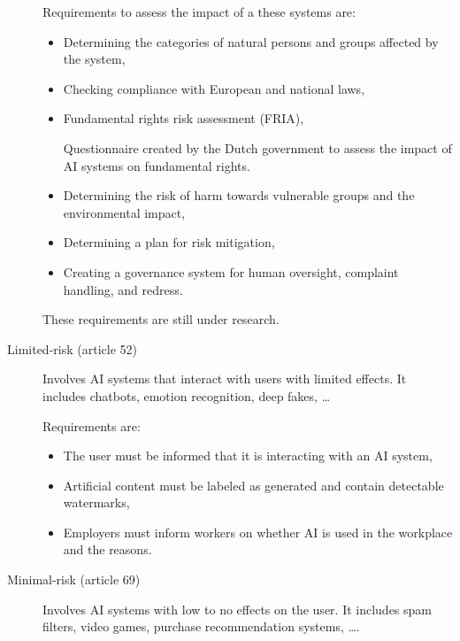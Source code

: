 \begin{description}
        Requirements to assess the impact of a these systems are:
        \begin{itemize}
            \item Determining the categories of natural persons and groups affected by the system,
            \item Checking compliance with European and national laws,
            \item Fundamental rights risk assessment (FRIA),
                \begin{example}[FRAIA]
                    Questionnaire created by the Dutch government to assess the impact of AI systems on fundamental rights.
                \end{example}
            \item Determining the risk of harm towards vulnerable groups and the environmental impact,
            \item Determining a plan for risk mitigation,
            \item Creating a governance system for human oversight, complaint handling, and redress.
        \end{itemize}

        \begin{remark}
            These requirements are still under research.
        \end{remark}

    \item[Limited-risk (article 52)] 
        Involves AI systems that interact with users with limited effects. It includes chatbots, emotion recognition, deep fakes, \dots

        Requirements are:
        \begin{itemize}
            \item The user must be informed that it is interacting with an AI system,
            \item Artificial content must be labeled as generated and contain detectable watermarks,
            \item Employers must inform workers on whether AI is used in the workplace and the reasons.
        \end{itemize}
    
    \item[Minimal-risk (article 69)] 
        Involves AI systems with low to no effects on the user. It includes spam filters, video games, purchase recommendation systems, \dots.
        

\end{description}
